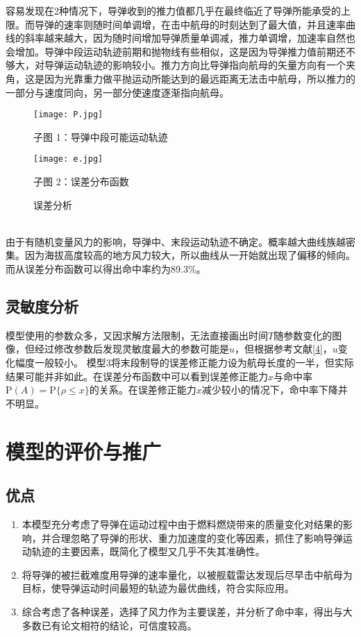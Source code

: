 \documentclass[UTF8]{article}
\begin{document}
\indent 容易发现在2种情况下，导弹收到的推力值都几乎在最终临近了导弹所能承受的上限。而导弹的速率则随时间单调增，在击中航母的时刻达到了最大值，并且速率曲线的斜率越来越大，因为随时间增加导弹质量单调减，推力单调增，加速率自然也会增加。导弹中段运动轨迹前期和抛物线有些相似，这是因为导弹推力值前期还不够大，对导弹运动轨迹的影响较小。推力方向比导弹指向航母的矢量方向有一个夹角，这是因为光靠重力做平抛运动所能达到的最远距离无法击中航母，所以推力的一部分与速度同向，另一部分使速度逐渐指向航母。
\begin{figure}[htbp]
\centering
\begin{minipage}[htbp]{7cm}
\centering
\texttt{[image: P.jpg]}
\caption*{子图 1：导弹中段可能运动轨迹}
\end{minipage}
\begin{minipage}[htbp]{7cm}
\centering
\texttt{[image: e.jpg]}
\caption*{子图 2：误差分布函数}
\end{minipage}
\caption{误差分析}
\end{figure}\\
\indent 由于有随机变量风力的影响，导弹中、末段运动轨迹不确定。概率越大曲线族越密集。因为海拔高度较高的地方风力较大，所以曲线从一开始就出现了偏移的倾向。而从误差分布函数可以得出命中率约为89.3\%。

\subsection{灵敏度分析}
模型使用的参数众多，又因求解方法限制，无法直接画出时间\(T\)随参数变化的图像，但经过修改参数后发现灵敏度最大的参数可能是\(u\)，但根据参考文献\ref{4}，\(u\)变化幅度一般较小。
\indent 模型3将末段制导的误差修正能力设为航母长度的一半，但实际结果可能并非如此。在误差分布函数中可以看到误差修正能力\(x\)与命中率\(\textrm{P}(A)=\textrm{P}\{\rho\leqslant x\}\)的关系。在误差修正能力\(x\)减少较小的情况下，命中率下降并不明显。

\section{模型的评价与推广}
\subsection{优点}
\begin{enumerate}[1]
\item 本模型充分考虑了导弹在运动过程中由于燃料燃烧带来的质量变化对结果的影响，并合理忽略了导弹的形状、重力加速度的变化等因素，抓住了影响导弹运动轨迹的主要因素，既简化了模型又几乎不失其准确性。
\item 将导弹的被拦截难度用导弹的速率量化，以被舰载雷达发现后尽早击中航母为目标，使导弹运动时间最短的轨迹为最优曲线，符合实际应用。
\item 综合考虑了各种误差，选择了风力作为主要误差，并分析了命中率，得出与大多数已有论文相符的结论，可信度较高。

\end{enumerate}
\end{document}
